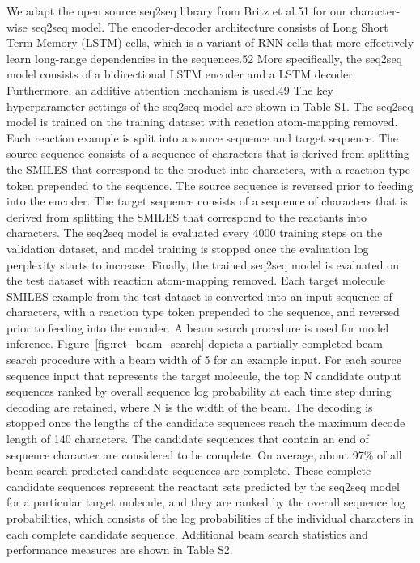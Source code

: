 We adapt the open source seq2seq library from Britz et al.51 for our character-wise seq2seq model. The encoder-decoder architecture consists of Long Short Term Memory (LSTM) cells, which is a variant of RNN cells that more effectively learn long-range dependencies in the sequences.52 More specifically, the seq2seq model consists of a bidirectional LSTM encoder and a LSTM decoder. Furthermore, an additive attention mechanism is used.49 The key hyperparameter settings of the seq2seq model are shown in Table S1.
The seq2seq model is trained on the training dataset with reaction atom-mapping removed. Each reaction example is split into a source sequence and target sequence. The source sequence consists of a sequence of characters that is derived from splitting the SMILES that correspond to the product into characters, with a reaction type token prepended to the sequence. The source sequence is reversed prior to feeding into the encoder. The target sequence consists of a sequence of characters that is derived from splitting the SMILES that correspond to the reactants into characters. The seq2seq model is evaluated every 4000 training steps on the validation dataset, and model training is stopped once the evaluation log perplexity starts to increase. 
Finally, the trained seq2seq model is evaluated on the test dataset with reaction atom-mapping removed. Each target molecule SMILES example from the test dataset is converted into an input sequence of characters, with a reaction type token prepended to the sequence, and reversed prior to feeding into the encoder. A beam search procedure is used for model inference. Figure~\ref{fig:ret_beam_search} depicts a partially completed beam search procedure with a beam width of 5 for an example input. For each source sequence input that represents the target molecule, the top N candidate output sequences ranked by overall sequence log probability at each time step during decoding are retained, where N is the width of the beam. The decoding is stopped once the lengths of the candidate sequences reach the maximum decode length of 140 characters. The candidate sequences that contain an end of sequence character are considered to be complete. On average, about 97\% of all beam search predicted candidate sequences are complete. These complete candidate sequences represent the reactant sets predicted by the seq2seq model for a particular target molecule, and they are ranked by the overall sequence log probabilities, which consists of the log probabilities of the individual characters in each complete candidate sequence. Additional beam search statistics and performance measures are shown in Table S2.


